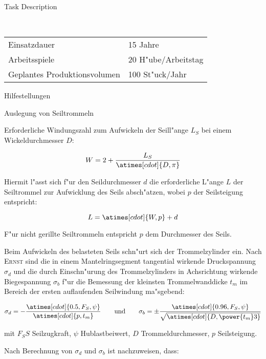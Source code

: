 \documentclass[a4paper]{omdoc}
\begin{document}
\begin{omgroup}{Task Description}
\begin{omtext}[title=Gebrauch und Produktion]\strut\\
\begin{tabular}{ll}
Einsatzdauer & 15 Jahre\\
Arbeitsspiele	& 20 H"ube/Arbeitstag\\
Geplantes Produktionsvolumen& 100 St"uck/Jahr
\end{tabular}
\end{omtext}
\end{omgroup}
\begin{appendix}
\begin{omgroup}{Hilfestellungen}
\begin{omgroup}{Auslegung von Seiltrommeln}
\begin{omtext}[title=Seiltrommel einlagig bewickelt]
  Erforderliche Windungszahl zum Aufwickeln der Seill"ange $L_S$ bei einem
  Wickeldurchmesser $D$:

\[W=2+\frac{L_S}{\atimes[cdot]{D,\pi}}\]

Hiermit l"asst sich f"ur den Seildurchmesser $d$ die erforderliche L"ange $L$ der
Seiltrommel zur Aufwicklung des Seils absch"atzen, wobei $p$ der Seilsteigung entspricht:

\[L=\atimes[cdot]{W,p}+d\]
\end{omtext}

\begin{omtext}[title=Hinweis] 
  F"ur nicht gerillte Seiltrommeln entspricht $p$ dem Durchmesser des Seils.
\end{omtext}

\begin{omtext}[title=Trommelwanddicke]
  Beim Aufwickeln des belasteten Seils schn"urt sich der Trommelzylinder ein. Nach
  \textsc{Ernst} sind die in einem Mantelringsegment tangential wirkende Druckspannung
  $\sigma_d$ und die durch Einschn"urung des Trommelzylinders in Achsrichtung wirkende
  Biegespannung $\sigma_b$ f"ur die Bemessung der kleinsten Trommelwanddicke $t_m$ im
  Bereich der ersten auflaufenden Seilwindung ma"sgebend:

  \[\sigma_d=-\frac{\atimes[cdot]{0.5,F_S,\psi}}{\atimes[cdot]{p,t_m}}
  \qquad\text{und}\qquad
  \sigma_b=\pm\frac{\atimes[cdot]{0.96,F_S,\psi}}{\sqrt{\atimes[cdot]{D,\power{t_m}3}}}
  \]

  mit $F_SS$ Seilzugkraft, $\psi$ Hublastbeiwert, $D$ Trommeldurchmesser, $p$
  Seilsteigung.
\end{omtext}

\begin{omtext}
  Nach Berechnung von $\sigma_d$ und $\sigma_b$ ist nachzuweisen, dass:


\end{omtext}
\end{omgroup}
\end{omgroup}
\end{appendix}
\end{document}
